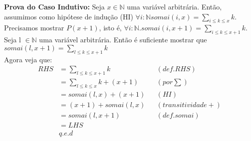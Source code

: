 \documentclass{article}
\begin{document}
\noindent \textbf{Prova do Caso Indutivo:} Seja $x \in \mathbb{N}$ uma variável arbitrária. Então, assumimos como hipótese de indução (HI)
$\forall i:\mathbb{N} somai(i, x) = \sum\limits_{i \le k \le x} k$. \\
Precisamos mostrar $P(x+1)$, isto é, $\forall i:\mathbb{N}. somai(i, x+1) = \sum\limits_{i \le k \le x+1} k$. \\
Seja l $\in \mathbb{N}$ uma variável arbitrária. Então é suficiente mostrar que
$somai(l, x+1) = \sum\limits_{l \le k \le x+1} k$ \\
Agora veja que:
\begin{align*}
RHS &= \sum\limits_{l \le k \le x+1} k && (def. RHS)\\
&= \sum\limits_{l \le k \le x} k + (x+1) && (por \sum)\\
&= somai(l, x) + (x+1) && (HI)\\
&= (x+1) + somai(l, x) && (transitividade +)\\
&= somai(l, x+1) && (def. somai)\\
&= LHS\\
& q.e.d
\end{align*}
\end{document}
